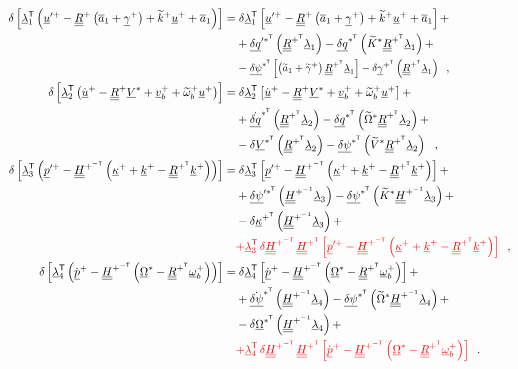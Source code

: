 \documentclass[12pt,a4paper,oneside,english]{abntex2} %
\newcommand{\fix}[1]{{\color{red}#1}}
\newcommand{\vect}[1]{\underline{#1}}
\newcommand{\uvec}[1]{\overline{#1}}
\def\tens#1{\underline{\underline{#1}}}
\def\til#1{\widetilde{#1}}
\def\lb{\left[}
\def\rb{\right]}
\def\lp{\left(}
\def\rp{\right)}
\def\T{\mathsf{T}}
\def\aone{\uvec{a}_1}
\def\aonetil{\til{a}_1}
\def\R{\tens{R}}
\def\Rp{\R^+}
\def\RpT{\R^{+^\T}}
\def\u{\vect{u}}
\def\uplus{\u^{+}}
\def\updot{\dot{\u}^{+}}
\def\upprime{\u^{\prime+}}
\def\vb{\vect{v}_b}
\def\vbplus{\vb^{+}}
\def\om{\vect{\omega}_b}
\def\omp{\om^{+}}
\def\omtil{\til{\omega}_b}
\def\omtilp{\omtil^{+}}
\def\gam{\vect{\gamma}}
\def\gamp{\gam^{+}}
\def\gampT{\gam^{+^\T}}
\def\gamptil{\til{\gamma}^{+}}
\def\kap{\vect{\kappa}}
\def\kapp{\kap^{+}}
\def\kappT{\kap^{+^\T}}
\def\k{\vect{k}}
\def\kp{\k^{+}}
\def\ktil{\til{k}}
\def\ktilp{\ktil^{+}}
\def\Ktil{\til{K}}
\def\Ktils{\Ktil^{*}}
\def\V{\vect{V}}
\def\Vs{\V^{*}}
\def\VsT{\V^{*^\T}}
\def\Vtils{\til{V}^{*}}
\def\Om{\vect{\Omega}}
\def\Oms{\Om^{*}}
\def\OmsT{\Om^{*^\T}}
\def\Omtil{\til{\Omega}}
\def\Omtils{\Omtil^{*}}
\def\H{\tens{H}}
\def\HpT{\H^{+^\T}}
\def\Hpinv{\H^{+^{-1}}}
\def\HpmT{\H^{+^{-\T}}}
\def\p{\vect{p}}
\def\pdot{\dot{\p}}
\def\ppdot{\pdot^{+}}
\def\ppprime{\p^{\prime{+}}}
\def\delq{\vect{\delta q}}
\def\delqdotsT{\dot{\delq}^{*^\T}}
\def\delqsT{\delq^{*^\T}}
\def\delqpsT{\delq^{{\prime*}^\T}}
\def\delpsi{\vect{\delta\psi}}
\def\delpsisT{\delpsi^{*^\T}}
\def\delpsipsT{\delpsi^{\prime*^\T}}
\def\delpsidot{\dot{\delpsi}}
\def\delpsisdotT{\delpsidot^{*^\T}}
\def\lamb{\vect{\lambda}}
\begin{document}
\begin{align}
    \delta\lb\lamb_1^\T\lp\upprime-\Rp\lp\aone+\gamp\rp+\ktilp\uplus+\aone\rp\rb =& \;\delta\lamb_1^\T\lb\upprime-\Rp\lp\aone+\gamp\rp+\ktilp\uplus+\aone\rb + \nonumber \\ & +\delqpsT\lp\RpT\lamb_1\rp - \delqsT\lp\Ktils\RpT\lamb_1\rp +  \nonumber \\ & -\scalebox{0.9}{$\displaystyle \delpsisT\lb\lp\aonetil+\gamptil\rp\RpT\lamb_1\rb - \delta\gampT\lp\RpT\lamb_1\rp$} \ \ , \label{eq:dellamb1} 
    \\
	 \delta\lb\lamb_2^\T\lp\updot-\Rp\Vs+\vbplus+\omtilp\uplus\rp\rb =& \;\delta\lamb_2^\T\lb\updot-\Rp\Vs+\vbplus+\omtilp\uplus\rb + \nonumber \\ & +\delqdotsT\lp\RpT\lamb_2\rp - \delqsT\lp\Omtils\RpT\lamb_2\rp + \nonumber \\ & -\delta\VsT\lp\RpT\lamb_2\rp - \delpsisT\lp\Vtils\RpT\lamb_2\rp
	 \ \ , \label{eq:dellamb2} 
     \\
	 \delta\lb\lamb_3^\T\lp\ppprime-\HpmT\lp\kapp+\kp-\RpT\kp\rp\rp\rb =& \;\delta\lamb_3^\T\lb\ppprime-\HpmT\lp\kapp+\kp-\RpT\kp\rp\rb + \nonumber \\ & +\delpsipsT\lp\Hpinv\lamb_3\rp - \delpsisT\lp\Ktils\Hpinv\lamb_3\rp + \nonumber \\ & -\delta\kappT\lp\Hpinv\lamb_3\rp + \nonumber \\
     & \fix{+ \lamb_3^\T\,\delta\HpmT\,\HpT\lb\ppprime-\HpmT\lp\kapp+\kp-\RpT\kp\rp\rb}
	 \ \ , \label{eq:dellamb3} 
     \\
	 \delta\lb\lamb_4^\T\lp\ppdot-\HpmT\lp\Oms-\RpT\omp\rp\rp\rb =& \;\delta\lamb_4^\T\lb\ppdot-\HpmT\lp\Oms-\RpT\omp\rp\rb + \nonumber \\ & +\delpsisdotT\lp\Hpinv\lamb_4\rp - \delpsisT\lp\Omtils\Hpinv\lamb_4\rp + \nonumber \\ & -\delta\OmsT\lp\Hpinv\lamb_4\rp + \nonumber \\
     & \fix{+ \lamb_4^\T\,\delta\HpmT\,\HpT\lb\ppdot-\HpmT\lp\Oms-\RpT\omp\rp\rb}
	 \ \ . \label{eq:dellamb4} 
\end{align}
\end{document}
